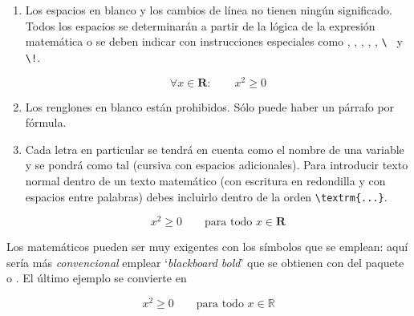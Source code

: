 \begin{enumerate}

\item Los espacios en blanco y los cambios de línea no tienen ningún
  significado. Todos los espacios se determinarán a partir de la
  lógica de la expresión matemática o se deben indicar con
  instrucciones especiales como \ci{,}, , , \ci{:},
  \ci{;}, \verb|\ | y \verb|\!|.%
%
%

\begin{example}
\begin{equation}
\forall x \in \mathbf{R}:
\qquad x^{2} \geq 0
\end{equation}
\end{example}
 
\item Los renglones en blanco están prohibidos. Sólo puede haber un
  párrafo por fórmula.
\item Cada letra en particular se tendrá en cuenta como el nombre de
  una variable y se pondrá como tal (cursiva con espacios
  adicionales). Para introducir texto normal dentro de un texto
  matemático (con escritura en redondilla y con espacios entre
  palabras) debes incluirlo dentro de la orden \verb|\textrm{...}|.

\begin{example}
\begin{equation}
x^{2} \geq 0\qquad
\textrm{para todo }x\in\mathbf{R}
\end{equation}
\end{example}
 
\end{enumerate}

%
%

Los   matemáticos  pueden   ser   muy  exigentes   con  los   símbolos
que   se  emplean:   aquí   sería   más  \emph{convencional}   emplear
`\emph{blackboard bold}'    que se
obtienen con   del paquete   o .
\ifx\mathbb\undefined\else El último ejemplo se convierte en

\begin{example}
\begin{displaymath}
x^{2} \geq 0\qquad
\textrm{para todo }x\in\mathbb{R}
\end{displaymath}
\end{example}
\fi

